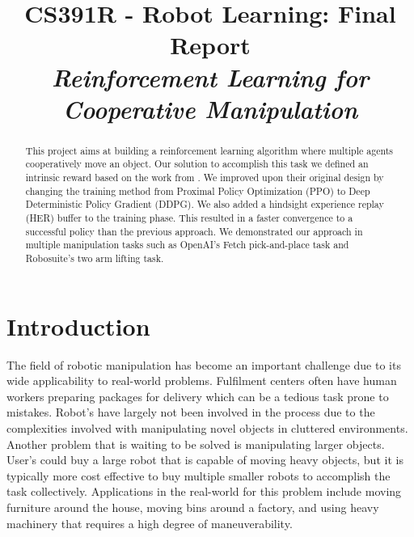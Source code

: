 \documentclass[conference]{IEEEtran}
\begin{document}
\title{CS391R - Robot Learning: Final Report\\ \large \textit{Reinforcement Learning for Cooperative Manipulation}}

\author{
\and
{}}

\maketitle

\thispagestyle{plain}
\pagestyle{plain}

\begin{abstract}
This project aims at building a reinforcement learning algorithm where multiple agents cooperatively move an object. Our solution to accomplish this task we defined an intrinsic reward based on the work from \cite{DBLB}. We improved upon their original design by changing the training method from Proximal Policy Optimization (PPO) to Deep Deterministic Policy Gradient (DDPG). We also added a hindsight experience replay (HER) buffer to the training phase. This resulted in a faster convergence to a successful policy than the previous approach. We demonstrated our approach in multiple manipulation tasks such as OpenAI's Fetch pick-and-place task and Robosuite's two arm lifting task.
\end{abstract}

\IEEEpeerreviewmaketitle

\section{Introduction}\label{sec:introduction}

The field of robotic manipulation has become an important challenge due to its wide applicability to real-world problems. Fulfilment centers often have human workers preparing packages for delivery which can be a tedious task prone to mistakes. Robot's have largely not been involved in the process due to the complexities involved with manipulating novel objects in cluttered environments. Another problem that is waiting to be solved is manipulating larger objects. User's could buy a large robot that is capable of moving heavy objects, but it is typically more cost effective to buy multiple smaller robots to accomplish the task collectively. Applications in the real-world for this problem include moving furniture around the house, moving bins around a factory, and using heavy machinery that requires a high degree of maneuverability.
\end{document}
